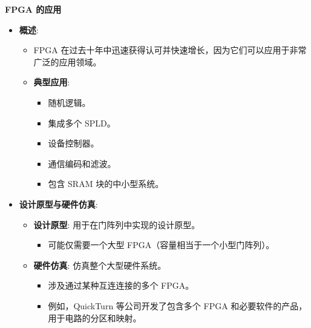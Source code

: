 \documentclass[
  ignorenonframetext,
  chinese,
]{beamer}
\providecommand{\tightlist}{%
  \setlength{\itemsep}{0pt}\setlength{\parskip}{0pt}}
\begin{document}
\begin{frame}
\begin{block}{\textbf{FPGA 的应用}}
\label{fpga-ux7684ux5e94ux7528}
\begin{itemize}
\tightlist
\item
  \textbf{概述}:

  \begin{itemize}
  \tightlist
  \item
    FPGA
    在过去十年中迅速获得认可并快速增长，因为它们可以应用于非常广泛的应用领域。
  \item
    \textbf{典型应用}:

    \begin{itemize}
    \tightlist
    \item
      随机逻辑。
    \item
      集成多个 SPLD。
    \item
      设备控制器。
    \item
      通信编码和滤波。
    \item
      包含 SRAM 块的中小型系统。
    \end{itemize}
  \end{itemize}
\item
  \textbf{设计原型与硬件仿真}:

  \begin{itemize}
  \tightlist
  \item
    \textbf{设计原型}: 用于在门阵列中实现的设计原型。

    \begin{itemize}
    \tightlist
    \item
      可能仅需要一个大型 FPGA（容量相当于一个小型门阵列）。
    \end{itemize}
  \item
    \textbf{硬件仿真}: 仿真整个大型硬件系统。

    \begin{itemize}
    \tightlist
    \item
      涉及通过某种互连连接的多个 FPGA。
    \item
      例如，QuickTurn 等公司开发了包含多个 FPGA
      和必要软件的产品，用于电路的分区和映射。
    \end{itemize}
  \end{itemize}
\end{itemize}
\end{block}
\end{frame}
\end{document}
